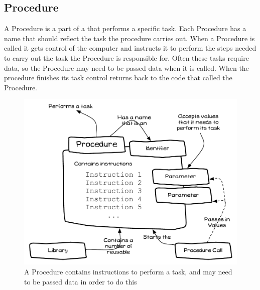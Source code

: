 \clearpage
\subsection{Procedure} %
\label{sub:procedure}

A Procedure is a part of a  that performs a specific task. Each Procedure has a name that should reflect the task the procedure carries out. When a Procedure is called it gets control of the computer and instructs it to perform the steps needed to carry out the task the Procedure is responsible for. Often these tasks require data, so the Procedure may need to be passed data when it is called. When the procedure finishes its task control returns back to the code that called the Procedure.

\begin{figure}[h]
   \centering
   \includegraphics[width=\textwidth]{./topics/program-creation/diagrams/Procedure} 
   \caption[Procedure Concept Diagram]{A Procedure contains instructions to perform a task, and may need to be passed data in order to do this}
   \label{fig:program-creation-procedure}
\end{figure}



